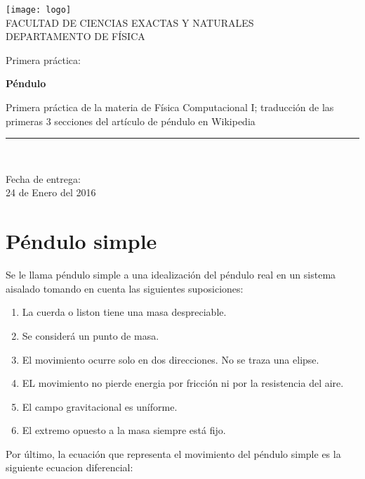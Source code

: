 \documentclass[12pt]{article}
\begin{document}
\begin{titlepage}

\begin{center}
 \texttt{[image: logo]}\\[0.5 cm]

FACULTAD DE CIENCIAS EXACTAS Y NATURALES\\
\vspace*{0.15in}
DEPARTAMENTO DE FÍSICA \\
\vspace*{0.6in}
\begin{large}
Primera práctica:\\
\end{large}
\vspace*{0.2in}
\begin{Large}
\textbf{Péndulo } \\
\end{Large}
\vspace*{0.3in}
\begin{large}
Primera práctica de la materia de Física Computacional I; traducción de las primeras 3 secciones del artículo de péndulo en Wikipedia\\
\end{large}
\vspace*{0.3in}
\rule{80mm}{0.1mm}\\
\vspace*{0.1in}
\begin{large}
Fecha de entrega: \\
24 de Enero del 2016 \\
\end{large}
\end{center}

\end{titlepage}





\newpage

\section{Péndulo simple}
Se le llama péndulo simple a una idealización del péndulo real en un sistema aisalado tomando en cuenta las siguientes suposiciones:
\begin{enumerate}
\item La cuerda o liston tiene una masa despreciable.
\item Se considerá un punto de masa.
\item El movimiento ocurre solo en dos direcciones. No se traza una elipse.
\item EL movimiento no pierde energia por fricción ni por la resistencia del aire.
\item El campo gravitacional es uníforme.
\item El extremo opuesto a la masa siempre está fijo.

\end{enumerate}
Por último, la ecuación que representa el movimiento del péndulo simple es la siguiente ecuacion diferencial:
\end{document}
